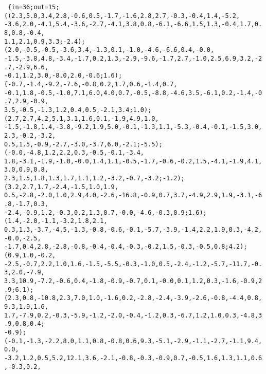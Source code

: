 \texttt{
\{in=36;out=15;((2.3,5.0,3.4,2.8,-0.6,0.5,-1.7,-1.6,2.8,2.7,-0.3,-0.4,1.4,-5.2,\\
-3.6,2.0,-4.1,5.4,-3.6,-2.7,-4.1,3.8,0.8,-6.1,-6.6,1.5,1.3,-0.4,1.7,0.8,0.8,-0.4,\\
1.1,2.1,0.9,3.3;-2.4);(2.0,-0.5,-0.5,-3.6,3.4,-1.3,0.1,-1.0,-4.6,-6.6,0.4,-0.0,\\
-1.5,-3.8,4.8,-3.4,-1.7,0.2,1.3,-2.9,-9.6,-1.7,2.7,-1.0,2.5,6.9,3.2,-2.7,-2.9,6.6,\\
-0.1,1.2,3.0,-8.0,2.0,-0.6;1.6);(-0.7,-1.4,-9.2,-7.6,-0.8,0.2,1.7,0.6,-1.4,0.7,\\
-0.1,1.8,-0.5,-1.0,7.1,6.0,4.0,0.7,-0.5,-8.8,-4.6,3.5,-6.1,0.2,-1.4,-0.7,2.9,-0.9,\\
3.5,-0.5,-1.3,1.2,0.4,0.5,-2.1,3.4;1.0);(2.7,2.7,4.2,5.1,3.1,1.6,0.1,-1.9,4.9,1.0,\\
-1.5,-1.8,1.4,-3.8,-9.2,1.9,5.0,-0.1,-1.3,1.1,-5.3,-0.4,-0.1,-1.5,3.0,2.3,-0.2,-3.2,\\
0.5,1.5,-0.9,-2.7,-3.0,-3.7,6.0,-2.1;-5.5);(-0.0,-4.8,1.2,2.2,0.3,-0.5,-0.1,-3.4,\\
1.8,-3.1,-1.9,-1.0,-0.0,1.4,1.1,-0.5,-1.7,-0.6,-0.2,1.5,-4.1,-1.9,4.1,3.0,0.9,0.8,\\
2.3,1.5,1.8,1.3,1.7,1.1,1.2,-3.2,-0.7,-3.2;-1.2);(3.2,2.7,1.7,-2.4,-1.5,1.0,1.9,\\
0.5,-2.8,-2.0,1.0,2.9,4.0,-2.6,-16.8,-0.9,0.7,3.7,-4.9,2.9,1.9,-3.1,-6.8,-1.7,0.3,\\
-2.4,-0.9,1.2,-0.3,0.2,1.3,0.7,-0.0,-4.6,-0.3,0.9;1.6);(1.4,-2.0,-1.1,-3.2,1.8,2.1,\\
0.3,1.3,-3.7,-4.5,-1.3,-0.8,-0.6,-0.1,-5.7,-3.9,-1.4,2.2,1.9,0.3,-4.2,-0.0,-2.5,\\
-1.7,0.4,2.8,-2.8,-0.8,-0.4,-0.4,-0.3,-0.2,1.5,-0.3,-0.5,0.8;4.2);(0.9,1.0,-0.2,\\
-2.5,-0.7,2.2,1.0,1.6,-1.5,-5.5,-0.3,-1.0,0.5,-2.4,-1.2,-5.7,-11.7,-0.3,2.0,-7.9,\\
3.3,10.9,-7.2,-0.6,0.4,-1.8,-0.9,-0.7,0.1,-0.0,0.1,1.2,0.3,-1.6,-0.9,2.9;6.1);\\
(2.3,0.8,-10.8,2.3,7.0,1.0,-1.6,0.2,-2.8,-2.4,-3.9,-2.6,-0.8,-4.4,0.8,9.3,1.9,1.6,\\
1.7,-7.9,0.2,-0.3,-5.9,-1.2,-2.0,-0.4,-1.2,0.3,-6.7,1.2,1.0,0.3,-4.8,3.9,0.8,0.4;\\
-0.9);(-0.1,-1.3,-2.2,8.0,1.1,0.8,-0.8,0.6,9.3,-5.1,-2.9,-1.1,-2.7,-1.1,9.4,0.0,\\
-3.2,1.2,0.5,5.2,12.1,3.6,-2.1,-0.8,-0.3,-0.9,0.7,-0.5,1.6,1.3,1.1,0.6,-0.3,0.2,\\
}

